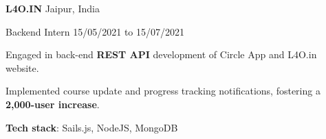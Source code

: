\textbf{\large L4O.IN} \hfill Jaipur, India

Backend Intern \hfill 15/05/2021 to 15/07/2021

\vspace{3pt}
\begin{resumeitemize}
    \item Engaged in back-end \textbf{REST API} development of Circle App and L4O.in website.
    \item Implemented course update and progress tracking notifications, fostering a \textbf{2,000-user increase}.
    \item \textbf{Tech stack}: Sails.js, NodeJS, MongoDB
\end{resumeitemize}